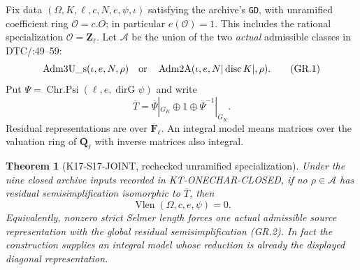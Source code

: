 \documentclass[11pt,a4paper]{article}
\newtheorem{theorem}{Theorem}[section]
\theoremstyle{definition}
\begin{document}
Fix data $(\Omega,K,\ell,c,N,e,\psi,\iota)$ satisfying the
archive's \texttt{GD}, with unramified coefficient ring
$\mathcal O=c.O$; in particular $e(\mathcal O)=1$.
This includes the rational specialization $\mathcal O=\mathbf Z_\ell$.
Let $\mathscr A$ be the union of the two \emph{actual} admissible
classes in DTC/:49--59:
\[
 \operatorname{Adm3U\_s}(\iota,e,N,\rho)
 \quad\hbox{or}\quad
 \operatorname{Adm2A}(\iota,e,N|\operatorname{disc}K|,\rho).
                                                               \tag{GR.1}
\]
Put $\Psi=\operatorname{Chr.Psi}(\ell,e,\operatorname{dirG}\psi)$
and write
\[
 \overline T=\overline\Psi|_{G_K}\oplus1
                    \oplus\overline\Psi^{-1}|_{G_K}.
                                                               \tag{GR.2}
\]
Residual representations are over $\overline{\mathbf F}_\ell$.
An integral model means matrices over the valuation ring of
$\overline{\mathbf Q}_\ell$ with inverse matrices also integral.

\begin{theorem}[K17-S17-JOINT, rechecked unramified specialization]
Under the nine closed archive inputs recorded in
KT-ONECHAR-CLOSED, if no $\rho\in\mathscr A$ has residual
semisimplification isomorphic to $\overline T$, then
\[
                   \operatorname{Vlen}(\Omega,c,e,\psi)=0.
                                                               \tag{GR.3}
\]
Equivalently, nonzero strict Selmer length forces one actual
admissible source representation with the global residual
semisimplification (GR.2). In fact the construction supplies
an integral model whose reduction is already the displayed
diagonal representation.
\end{theorem}
\end{document}
